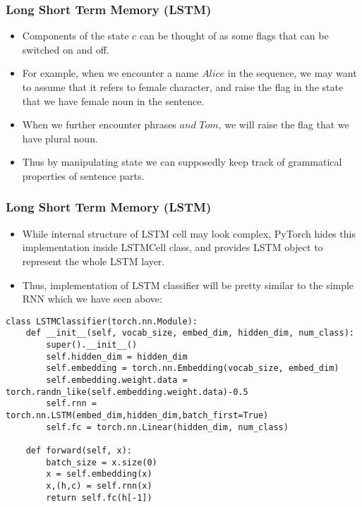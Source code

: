\begin{frame}[fragile] \frametitle{Long Short Term Memory (LSTM)}


\begin{itemize}

\item Components of the state $c$ can be thought of as some flags that can be switched on and off. 
\item For example, when we encounter a name $Alice$ in the sequence, we may want to assume that it refers to female character, and raise the flag in the state that we have female noun in the sentence. 
\item When we further encounter phrases $and$ $Tom$, we will raise the flag that we have plural noun. 
\item Thus by manipulating state we can supposedly keep track of grammatical properties of sentence parts.

\end{itemize}


\end{frame}

\begin{frame}[fragile] \frametitle{Long Short Term Memory (LSTM)}


\begin{itemize}
\item While internal structure of LSTM cell may look complex, PyTorch hides this implementation inside LSTMCell class, and provides LSTM object to represent the whole LSTM layer. 
\item Thus, implementation of LSTM classifier will be pretty similar to the simple RNN which we have seen above:

\end{itemize}

\begin{lstlisting}
class LSTMClassifier(torch.nn.Module):
    def __init__(self, vocab_size, embed_dim, hidden_dim, num_class):
        super().__init__()
        self.hidden_dim = hidden_dim
        self.embedding = torch.nn.Embedding(vocab_size, embed_dim)
        self.embedding.weight.data = torch.randn_like(self.embedding.weight.data)-0.5
        self.rnn = torch.nn.LSTM(embed_dim,hidden_dim,batch_first=True)
        self.fc = torch.nn.Linear(hidden_dim, num_class)

    def forward(self, x):
        batch_size = x.size(0)
        x = self.embedding(x)
        x,(h,c) = self.rnn(x)
        return self.fc(h[-1])
\end{lstlisting}

\end{frame}

